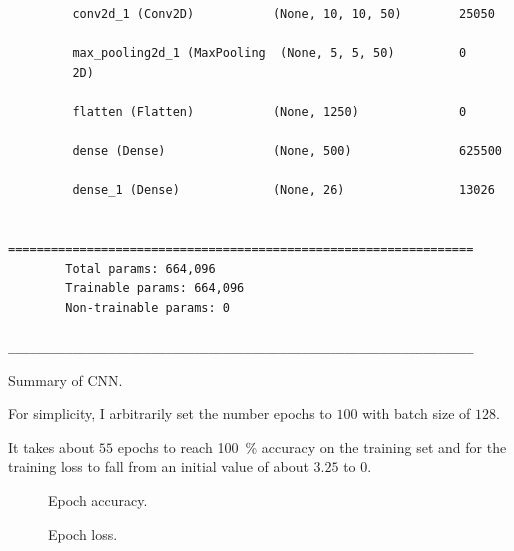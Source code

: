 \documentclass[a4paper]{exam}
\begin{document}
\begin{questions}
\begin{listing}[!ht]
\begin{verbatim}
         conv2d_1 (Conv2D)           (None, 10, 10, 50)        25050     
                                                                         
         max_pooling2d_1 (MaxPooling  (None, 5, 5, 50)         0         
         2D)                                                             
                                                                         
         flatten (Flatten)           (None, 1250)              0         
                                                                         
         dense (Dense)               (None, 500)               625500    
                                                                         
         dense_1 (Dense)             (None, 26)                13026     
                                                                         
        =================================================================
        Total params: 664,096
        Trainable params: 664,096
        Non-trainable params: 0
        _________________________________________________________________
        \end{verbatim}
        \caption{Summary of CNN.}
        \label{listing:1}
    \end{listing}


    For simplicity, I arbitrarily set the number epochs to $100$ with batch size of $128$.

    It takes about $55$ epochs to reach \qty{100}{\percent} accuracy on the training set and for the training loss to fall from an initial value of about $3.25$ to $0$.

    \begin{figure}[hb]
        \centering
        
        \caption{Epoch accuracy.}
        \label{fig:epoch_accuracy}
    \end{figure}

    \begin{figure}[htb]
        \centering
        
        \caption{Epoch loss.}
        \label{fig:epoch_loss}
    \end{figure}
\end{questions}
\clearpage


\end{document}
